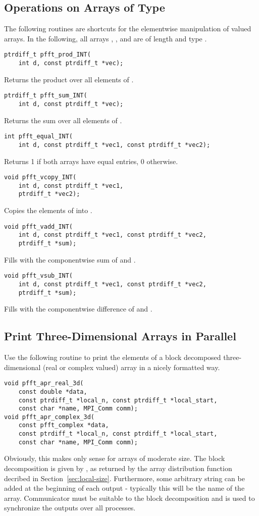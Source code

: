 \subsection{Operations on Arrays of Type }
The following routines are shortcuts for the elementwise manipulation of  valued arrays.
In the following, all arrays , , and  are of length  and type .
\begin{lstlisting}
ptrdiff_t pfft_prod_INT(
    int d, const ptrdiff_t *vec);
\end{lstlisting}
Returns the product over all elements of .
\begin{lstlisting}
ptrdiff_t pfft_sum_INT(
    int d, const ptrdiff_t *vec);
\end{lstlisting}
Returns the sum over all elements of .
\begin{lstlisting}
int pfft_equal_INT(
    int d, const ptrdiff_t *vec1, const ptrdiff_t *vec2);
\end{lstlisting}
Returns 1 if both arrays have equal entries, 0 otherwise.
\begin{lstlisting}
void pfft_vcopy_INT(
    int d, const ptrdiff_t *vec1,
    ptrdiff_t *vec2);
\end{lstlisting}
Copies the elements of  into .
\begin{lstlisting}
void pfft_vadd_INT(
    int d, const ptrdiff_t *vec1, const ptrdiff_t *vec2,
    ptrdiff_t *sum);
\end{lstlisting}
Fills  with the componentwise sum of  and .
\begin{lstlisting}
void pfft_vsub_INT(
    int d, const ptrdiff_t *vec1, const ptrdiff_t *vec2,
    ptrdiff_t *sum);
\end{lstlisting}
Fills  with the componentwise difference of  and .

\subsection{Print Three-Dimensional Arrays in Parallel}
Use the following routine to print the elements of a block decomposed three-dimensional (real or complex valued) array  in a nicely formatted way.
\begin{lstlisting}
void pfft_apr_real_3d(
    const double *data,
    const ptrdiff_t *local_n, const ptrdiff_t *local_start,
    const char *name, MPI_Comm comm);
void pfft_apr_complex_3d(
    const pfft_complex *data,
    const ptrdiff_t *local_n, const ptrdiff_t *local_start,
    const char *name, MPI_Comm comm);
\end{lstlisting}
Obviously, this makes only sense for arrays of moderate size.
The block decomposition is given by ,  as returned
by the array distribution function decribed in Section~\ref{sec:local-size}.
Furthermore, some arbitrary string  can be added at the beginning of each output - typically this will be the name of the array.
Communicator  must be suitable to the block decomposition and is used to synchronize the outputs over all processes.


